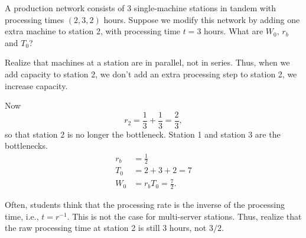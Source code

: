 \begin{question}
  A production network consists of 3 single-machine stations in tandem
  with processing times $(2, 3, 2)$ hours.  Suppose we modify this
  network by adding one extra machine to station 2, with processing
  time $t=3$ hours.  What are $W_0$, $r_b$ and $T_0$?
  \begin{solution}
    Realize that machines at a station are in parallel, not in
    series. Thus, when we add capacity to station 2, we don't add an
    extra processing step to station 2, we increase capacity. 

    Now 
    \begin{equation*}
      r_2 = \frac13 + \frac13 = \frac 23,
    \end{equation*}
    so that station 2 is no longer the bottleneck. Station 1 and
    station 3 are the bottlenecks.
    \begin{align*}
      r_b &= \frac12 \\
      T_0 &= 2 + 3 + 2 = 7\\
      W_0 &= r_b T_0 = \frac72.
    \end{align*}

    Often, students think that the processing rate is the inverse of
    the processing time, i.e., $t=r^{-1}$. This is not the case for
    multi-server stations. Thus, realize that the raw processing time
    at station 2 is still $3$ hours, not $3/2$.
  \end{solution}
\end{question}


